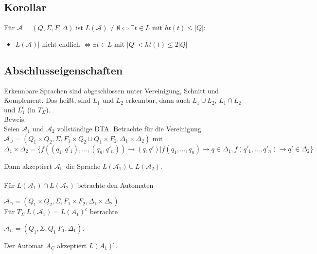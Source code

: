 \documentclass[titlepage]{article}
\begin{document}
\subsection{Korollar}

F\"ur $\mathcal{A} = (Q, \Sigma, F, \Delta)$ ist 
$L(\mathcal{A}) \neq \emptyset \Leftrightarrow \exists t \in L$ mit $ht(t) \leq |Q|$:

\begin{itemize}
	\item $L(\mathcal{A}) |$ nicht endlich 
		$\Leftrightarrow \exists t \in L$ mit $|Q| < ht(t) \leq 2 |Q|$
\end{itemize}

\subsection{Abschlusseigenschaften}

Erkennbare Sprachen sind abgeschlossen unter Vereinigung, Schnitt und Komplement. 
Das hei\ss t, sind $L_1$ und $L_2$ erkennbar, dann auch
$L_1 \cup L_2$, $L_1 \cap L_2$ und $L_1^c$ (in $T_\Sigma$).\\

Beweis:\\
Seien $\mathcal{A}_1$ und $\mathcal{A}_2$ vollst\"andige DTA. 
Betrachte f\"ur die Vereinigung\\
$\mathcal{A}_\cup = (Q_1 \times Q_2, \Sigma, F_1 \times Q_2 \cup Q_1 \times F_2, 
\Delta_1 \times \Delta_2)$ mit \\
$\Delta_1 \times \Delta_2 = \{ f((q_1, q'_1), \dots, (q_n, q'_n)) \rightarrow (q, q') |
f(q_1, \dots, q_n) \rightarrow q \in \Delta_1, f(q'_1, \dots, q'_n) \rightarrow q' \in 
\Delta_2 \}$

Dann akzeptiert $\mathcal{A}_\cup$ die Sprache $L(\mathcal{A}_1) \cup L(\mathcal{A}_2)$.\\ \\

F\"ur $L(\mathcal{A}_1) \cap L(\mathcal{A}_2)$ betrachte den Automaten

$\mathcal{A}_\cap = (Q_1 \times Q_2, \Sigma, F_1 \times F_2, \Delta_1 \times \Delta_2)$\\

F\"ur $T_\Sigma \ L(\mathcal{A}_1) = L(A_1)^c$ betrachte

$\mathcal{A}_C = (Q_1, \Sigma, Q_1 \ F_1, \Delta_1)$.

Der Automat $A_C$ akzeptiert $L(A_1)^c$.\\
\end{document}
